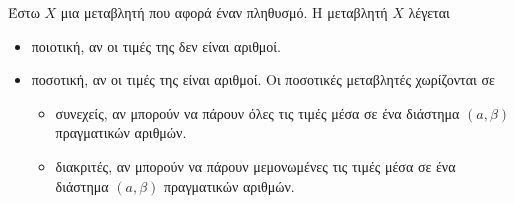 Έστω $ X $ μια μεταβλητή που αφορά έναν πληθυσμό. Η μεταβλητή $ X $ λέγεται
\begin{itemize}
\item ποιοτική, αν οι τιμές της δεν είναι αριθμοί.
\item ποσοτική, αν οι τιμές της είναι αριθμοί. Οι ποσοτικές μεταβλητές χωρίζονται σε
\begin{itemize}
\item συνεχείς, αν μπορούν να πάρουν όλες τις τιμές μέσα σε ένα διάστημα $ (a,\beta) $ πραγματικών αριθμών.
\item διακριτές, αν μπορούν να πάρουν μεμονωμένες τις τιμές μέσα σε ένα διάστημα $ (a,\beta) $ πραγματικών αριθμών.
\end{itemize}
\end{itemize}
